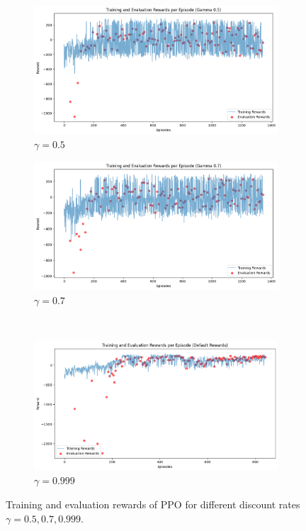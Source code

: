 \documentclass[a4paper, 11pt]{article}
\begin{document}
	\begin{figure}[H]
	\begin{center}
		\begin{subfigure}{0.48\textwidth}
			\includegraphics[width=\linewidth]{ppo_figures/gamma_results_0.5.png}
			\caption{$\gamma=0.5$}
			\label{fig:ppo_gamma0.5}
		\end{subfigure}\hfill 
		\begin{subfigure}{0.48\textwidth}
		\includegraphics[width=\linewidth]{ppo_figures/gamma_results_0.7.png}
		\caption{$\gamma=0.7$}
		\label{fig:ppo_gamma0.7}
		\end{subfigure}\\
		\begin{subfigure}{0.48\textwidth}
		\includegraphics[width=\linewidth]{ppo_figures/gamma_results_0.9.png}
		\caption{$\gamma=0.999$}
		\label{fig:ppo_gamma0.999}
		\end{subfigure}
	\end{center}
	\caption{Training and evaluation rewards of PPO for different discount rates $\gamma=0.5,0.7,0.999$.}
	\label{fig:ppo_gamma}
	\end{figure}
	
\end{document}
